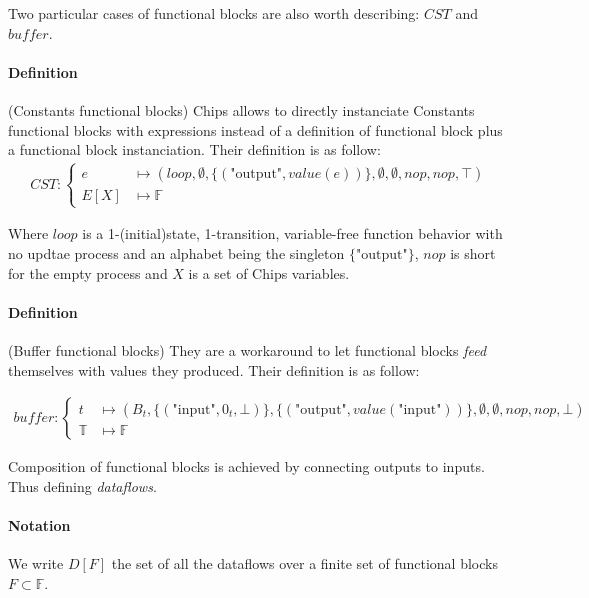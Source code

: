 \documentclass{article}
\begin{document}
Two particular cases of functional blocks are also worth describing: $CST$ and $buffer$.

\paragraph{Definition} (Constants functional blocks) Chips allows to directly instanciate Constants functional blocks with expressions instead of a definition of functional block plus a functional block instanciation. Their definition is as follow:
\begin{align}
    CST :
    \begin{cases}
        e       & \longmapsto (loop, \emptyset, \{ (\text{"output"}, value(e)) \}, \emptyset ,\emptyset, nop, nop, \top) \\
        E[X]    & \longmapsto \mathbb{F}
    \end{cases}
\end{align}

Where $loop$ is a 1-(initial)state, 1-transition, variable-free function behavior with no updtae process and an alphabet being the singleton $\{\text{"output"}\}$, $nop$ is short for the empty process and $X$ is a set of Chips variables.\\

\paragraph{Definition} (Buffer functional blocks) They are a workaround to let functional blocks \emph{feed} themselves with values they produced. Their definition is as follow:

\begin{align}
    buffer :
    \begin{cases}
        t & \longmapsto (B_t, \{ (\text{"input"}, 0_t, \bot) \}, \{ (\text{"output"}, value(\text{"input"})) \}, \emptyset,\emptyset, nop, nop, \bot) \\
        \mathbb{T}  & \longmapsto \mathbb{F}
    \end{cases}
\end{align}

Composition of functional blocks is achieved by connecting outputs to inputs. Thus defining \emph{dataflows}.

\paragraph{Notation} We write $D[F]$ the set of all the dataflows over a finite set of functional blocks $F \subset \mathbb{F}$.
\end{document}
